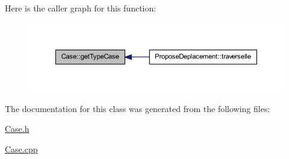 Here is the caller graph for this function:
\nopagebreak
\begin{figure}[H]
\begin{center}
\leavevmode
\includegraphics[width=378pt]{class_case_a5a7b67b678313b5caab23868219f16b0_icgraph}
\end{center}
\end{figure}




The documentation for this class was generated from the following files:\begin{DoxyCompactItemize}
\item 
\hyperlink{_case_8h}{Case.h}\item 
\hyperlink{_case_8cpp}{Case.cpp}\end{DoxyCompactItemize}
